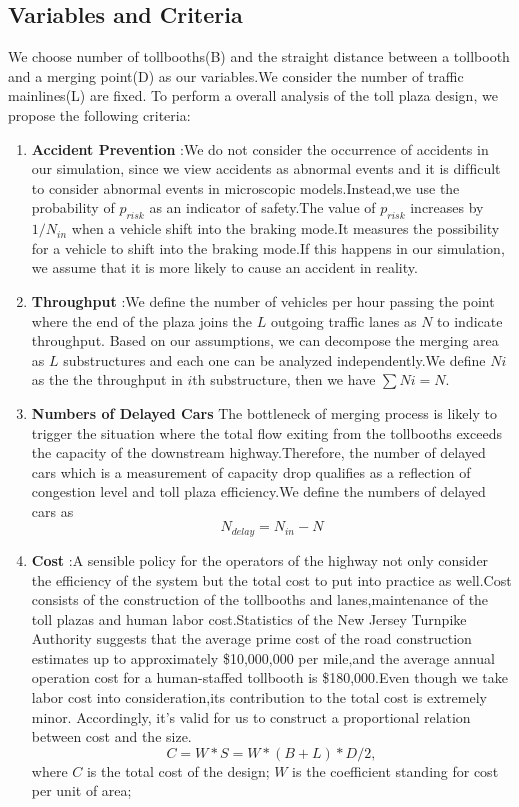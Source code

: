 \subsection{Variables and Criteria}
 We choose number of tollbooths(B) and the straight distance between a tollbooth and a merging point(D) as our variables.We consider the number of traffic mainlines(L) are fixed. To perform a overall analysis of the toll plaza design, we propose the following criteria:
 \begin{enumerate}[(1)]
\item{\textbf{Accident Prevention}}
:We do not consider the occurrence of accidents in our simulation, since we view accidents as abnormal events and it is difﬁcult to consider abnormal events in microscopic models.Instead,we use the probability of $p_{risk}$ as an indicator of safety.The value of $p_{risk}$ increases by $1/N_{in}$ when a vehicle shift into the braking mode.It measures the possibility for a vehicle to shift into the braking mode.If this happens in our simulation, we assume that it is more likely to cause an accident in reality.
\item{\textbf{Throughput}}
:We define the number of vehicles per hour passing the point where the end of the plaza joins the $L$ outgoing traffic lanes as $N$ to indicate throughput. Based on our assumptions, we can decompose the merging area as $L$ substructures and each one can be analyzed independently.We define $Ni$ as the the throughput in $i$th substructure, then we have $\sum{Ni} = N$.
\item{\textbf{Numbers of Delayed Cars}}
The bottleneck of merging process is likely to trigger the situation where the total flow exiting from the tollbooths exceeds the capacity of the downstream highway.Therefore, the number of delayed cars which is a measurement of capacity drop qualifies as a reflection of congestion level and toll plaza efficiency.We define the numbers of delayed cars as
      $$N_{delay}=N_{in}-N$$
\item{\textbf{Cost}}
:A sensible policy for the operators of the highway not only consider the efficiency of the system but the total cost to put into practice as well.Cost consists of the construction of the tollbooths and lanes,maintenance of the toll plazas and human labor cost.Statistics of the New Jersey Turnpike Authority suggests that the average prime cost of the road construction estimates up to approximately \$10,000,000 per mile,and the average annual operation cost for a human-staffed tollbooth is \$180,000.Even though we take labor cost into consideration,its contribution to the total cost is extremely minor. Accordingly, it's valid for us to construct a proportional relation between cost and the size.
     $$C=W*S=W*(B+L)*D/2,$$ 
where $C$ is the total cost of the design;
$W$ is the coefficient standing for cost per unit of area;
\end{enumerate}

